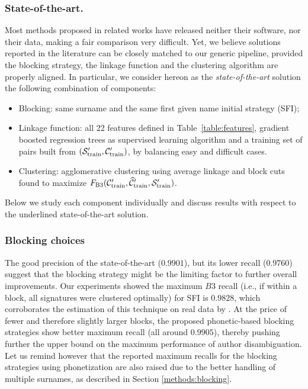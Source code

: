 \documentclass[runningheads,a4paper]{llncs}
\makeatletter
\newcommand*{\ie}{i.e.\@\xspace}
\newcommand{\longpage}{\enlargethispage{\baselineskip}}
\makeatother
\begin{document}
\subsubsection{State-of-the-art.} Most methods proposed in related works have released
neither their software, nor their data, making a fair comparison very difficult.
Yet, we believe solutions reported in the literature can be closely
matched to our generic pipeline, provided the blocking strategy, the linkage
function and the clustering algorithm are properly aligned. In particular,
we consider hereon as the \textit{state-of-the-art} solution the following
combination of components:


\longpage

\begin{itemize}
	\item Blocking: same surname and the same first given name initial strategy (SFI);
	\item Linkage function: all 22 features defined in Table~\ref{table:features},
	gradient boosted regression trees as supervised learning algorithm
	and a training set of pairs built from $({\cal S}_\text{train}^\prime, {\cal C}_\text{train}^\prime)$, by balancing easy and difficult cases.
	\item Clustering: agglomerative clustering using average linkage and
	block cuts found to maximize $F_\text{B3}({\cal C}_\text{train}^\prime, \widehat{\cal C}_\text{train}^\prime, {\cal S}_\text{train}^\prime)$.
\end{itemize}

Below we study each component individually and discuss
results with respect to the underlined state-of-the-art solution.

\subsubsection{Blocking choices}
\label{choices:blocking}

\longpage

The good precision of the state-of-the-art ($0.9901$), but its
lower recall ($0.9760$) suggest that the blocking strategy might be the
limiting factor to further overall improvements.
Our experiments showed the maximum $B3$ recall (\ie, if within a block, all signatures were clustered optimally) for SFI is $0.9828$, which corroborates the
estimation of this technique on real data by \cite{torvik2009author}.
At the price of fewer and therefore slightly larger blocks, the
proposed phonetic-based blocking strategies show better maximum recall (all
around $0.9905$), thereby pushing further the upper bound on the maximum
performance of author disambiguation.
Let us remind however that the reported maximum recalls for the blocking strategies using phonetization are
also raised due to the better handling of multiple surnames, as described in Section \ref{methods:blocking}.
\end{document}
